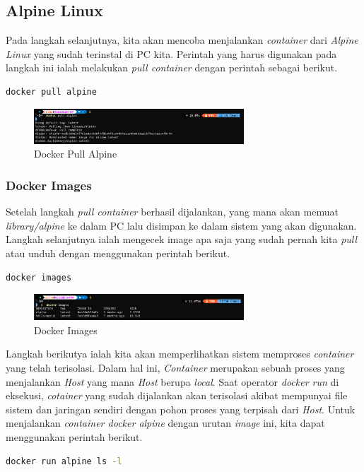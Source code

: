 \documentclass[11pt,a4paper]{article}
\begin{document}
\subsection{Alpine Linux}
    Pada langkah selanjutnya, kita akan mencoba menjalankan \textit{container} dari \textit{Alpine Linux} yang sudah terinstal di PC kita. Perintah yang 
    harus digunakan pada langkah ini ialah melakukan \textit{pull container} dengan perintah sebagai berikut.
    \begin{lstlisting}[language=bash]
        docker pull alpine
    \end{lstlisting}

    \begin{figure}[h]
        \centering
        \includegraphics[width = 0.7\textwidth]{Figures/docker-pull_alpine.png}
        \caption{Docker Pull Alpine}
    \end{figure}

\subsubsection{Docker Images}
    Setelah langkah \textit{pull container} berhasil dijalankan, yang mana akan memuat \textit{library/alpine} ke dalam PC lalu disimpan ke dalam sistem 
    yang akan digunakan. Langkah selanjutnya ialah mengecek image apa saja yang sudah pernah kita \textit{pull} atau unduh dengan menggunakan perintah 
    berikut.
    \begin{lstlisting}[language=bash]
        docker images
    \end{lstlisting}

    \begin{figure}[h]
        \centering
        \includegraphics[width = 0.7\textwidth]{Figures/docker-images.png}
        \caption{Docker Images}
    \end{figure}

    Langkah berikutya ialah kita akan memperlihatkan sistem memproses \textit{container} yang
    telah terisolasi. Dalam hal ini, \textit{Container} merupakan sebuah proses yang menjalankan \textit{Host} 
    yang mana \textit{Host} berupa \textit{local}. Saat operator \textit{docker run} di eksekusi, \textit{cotainer} 
    yang sudah dijalankan akan terisolasi akibat mempunyai file sistem dan jaringan sendiri dengan pohon proses 
    yang terpisah dari \textit{Host}. Untuk menjalankan \textit{container docker alpine} dengan urutan \textit{image} ini, 
    kita dapat menggunakan perintah berikut.
    \begin{lstlisting}[language=bash]
        docker run alpine ls -l
    \end{lstlisting}
\end{document}
